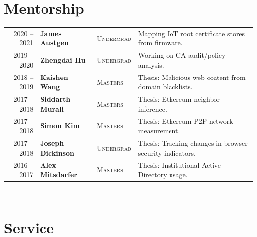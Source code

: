 \documentclass[10pt,singlecolumn]{article} %
\begin{document}
\section{Mentorship} 
\begin{tabular}{rlll}
2020 -- 2021 & \textbf{James Austgen} & \textsc{Undergrad} & Mapping IoT root certificate stores from firmware.\\ 
2019 -- 2020	         & \textbf{Zhengdai Hu} & \textsc{Undergrad} & Working on CA audit/policy analysis.\\ 
2018 -- 2019	         & \textbf{Kaishen Wang} & \textsc{Masters} & Thesis: Malicious web content from domain blacklists.\\
2017 -- 2018	         & \textbf{Siddarth Murali} & \textsc{Masters} & Thesis: Ethereum neighbor inference.\\ 
2017 -- 2018	         & \textbf{Simon Kim} & \textsc{Masters} & Thesis: Ethereum P2P network measurement.\\  
2017 -- 2018	         & \textbf{Joseph Dickinson} & \textsc{Undergrad} & Thesis: Tracking changes in browser security indicators.\\  
2016 -- 2017	         & \textbf{Alex Mitsdarfer} & \textsc{Masters} & Thesis: Institutional Active Directory usage.\\ 
\end{tabular}\\[10pt]




\newpage
\section{Service}
\end{document}
